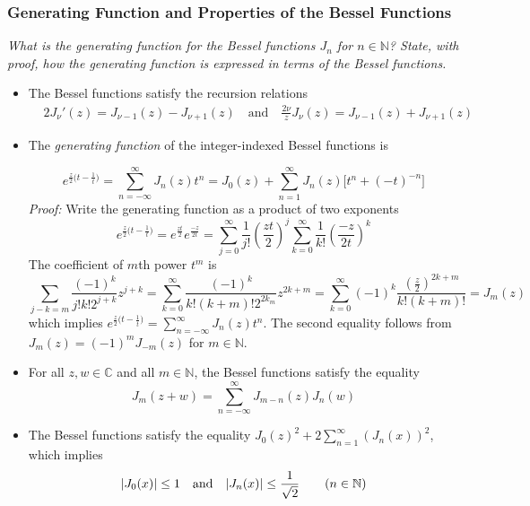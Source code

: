 \documentclass[11pt, a4paper]{article}
\newcommand{\question}[1]{\textit{#1}\vspace{2mm}}
\newcommand{\C}{\mathbb{C}} %
\begin{document}
\subsubsection{Generating Function and Properties of the Bessel Functions}
\question{What is the generating function for the Bessel functions $ J_{n} $ for $ n \in \mathbb{N} $? State, with proof, how the generating function is expressed in terms of the Bessel functions.}
\begin{itemize}
	\item The Bessel functions satisfy the recursion relations
	\begin{align*}
		&2 J_{\nu}'(z) = J_{\nu -1}(z) - J_{\nu + 1}(z) \quad \text{and} \quad \frac{2\nu}{z} J_{\nu}(z) = J_{\nu -1 }(z) + J_{\nu + 1}(z)
	\end{align*}
	
	\item The \textit{generating function} of the integer-indexed Bessel functions is

	\begin{equation*}
		e^{\frac{z}{2}\big(t - \frac{1}{t}\big)} = \sum_{n=-\infty}^{\infty} J_{n}(z)t^{n} = J_{0}(z) + \sum_{n=1}^{\infty}J_{n}(z)\big[t^{n} + (-t)^{-n}\big]
	\end{equation*}
	\textit{Proof:} Write the generating function as a product of two exponents
	\begin{equation*}
		e^{\frac{z}{2}\big(t - \frac{1}{t}\big)} = e^{\frac{zt}{2}}e^{\frac{-z}{2t}} = \sum_{j=0}^{\infty} \frac{1}{j!} \left(\frac{zt}{2}\right)^{j} \sum_{k=0}^{\infty}\frac{1}{k!}\left(\frac{-z}{2t}\right)^{k}
	\end{equation*}
	The coefficient of $ m $th power $ t^{m} $ is
	\begin{equation*}
		\sum_{j-k = m} \frac{(-1)^{k}}{j!k!2^{j+k}}z^{j+k} = \sum_{k=0}^{\infty} \frac{(-1)^{k}}{k!(k+m)!2^{2k_m}} z^{2k+m} = \sum_{k=0}^{\infty} (-1)^{k}\frac{\left(\frac{z}{2}\right)^{2k+m}}{k!(k+m)!} = J_{m}(z)
	\end{equation*}
	which implies $ e^{\frac{z}{2}\big(t - \frac{1}{t}\big)} = \sum_{n=-\infty}^{\infty} J_{n}(z)t^{n} $. The second equality follows from $ J_{m}(z) = (-1)^{m}J_{-m}(z) $ for $ m \in \mathbb{N} $.
	
	\item For all $ z, w \in \C $ and all $ m \in \mathbb{N} $, the Bessel functions satisfy the equality
	\begin{equation*}
		J_{m}(z + w) = \sum_{n=-\infty}^{\infty}J_{m-n}(z)J_{n}(w)
	\end{equation*}
	\vspace{-5mm}
	
	\item The Bessel functions satisfy the equality $ \displaystyle{J_{0}(z)^{2} + 2 \sum_{n=1}^{\infty} \left(J_{n}(x)\right)^{2}} $, which implies
	\begin{equation*}
		\abs{J_{0}(x)} \leq 1 \quad \text{and} \quad \abs{J_{n}(x)} \leq \frac{1}{\sqrt{2}} \qquad (n \in \mathbb{N})
	\end{equation*}
\end{itemize}
\end{document}
